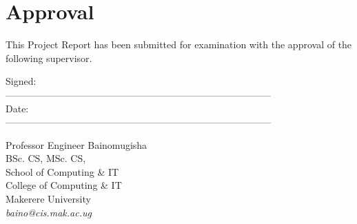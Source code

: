 \chapter*{Approval}
This Project Report has been submitted for examination with the approval of the following supervisor.

\vspace{1.0em}
\noindent
Signed: \\
-----------------------------------------------------------------------------------\\
Date: \\
-----------------------------------------------------------------------------------\\

\vspace{2.0em}

\noindent
Professor Engineer Bainomugisha \\
BSc. CS, MSc. CS,\\
School of Computing \& IT\\
College of Computing \& IT\\
Makerere University\\
\emph{baino@cis.mak.ac.ug}

\newpage
